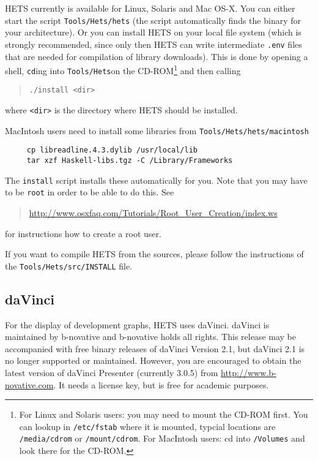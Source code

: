 \documentclass{article}
\newcommand{\normalTEXTSC}[2]{{#1\scriptsize#2}}
\newcommand     {\Hets}{\normalTEXTSC{H}{ETS}\xspace}
\begin{document}
\Hets currently is available for Linux, Solaris and
Mac OS-X. You can either start the script \texttt{Tools/Hets/hets} 
(the script automatically finds the binary for your architecture).
Or you can install \Hets on your local file system (which
is strongly recommended, since only then \Hets can write intermediate
\texttt{.env} files that are needed for compilation of library
downloads). This is done by
opening a shell, \texttt{cd}ing
into \texttt{Tools/Hets}on the CD-ROM\footnote{
For Linux and Solaris users: you may need to mount the CD-ROM first.
You can lookup in \texttt{/etc/fstab}
where it is mounted, typcial locations are \texttt{/media/cdrom}
or \texttt{/mount/cdrom}. 
For MacIntosh
users: cd into \texttt{/Volumes} and look there for the CD-ROM.} and then calling
\begin{quote}
\texttt{./install <dir>}
\end{quote}
where \texttt{<dir>} is the directory where \Hets should be
installed.

MacIntosh users need to install some libraries from 
\texttt{Tools/Hets/hets/macintosh}
\begin{verbatim}
     cp libreadline.4.3.dylib /usr/local/lib
     tar xzf Haskell-libs.tgz -C /Library/Frameworks 
\end{verbatim}
The \texttt{install} script installs these automatically for you.
Note that you may have to be \texttt{root} in order to be able to 
do this. See
\begin{quote}
 \url{http://www.osxfaq.com/Tutorials/Root\_User\_Creation/index.ws}
\end{quote}
for instructions how to create a root user.


If you want to compile \Hets from the sources, please follow the
instructions of the \texttt{Tools/Hets/src/INSTALL} file.

\subsection*{daVinci}
For the display of development graphs, \Hets uses daVinci.
daVinci is maintained by b-novative and b-novative holds all rights.
This release may be accompanied with free binary releases of daVinci
Version 2.1, but daVinci 2.1 is no longer supported or maintained.
However, you are encouraged to obtain the latest version of daVinci
Presenter (currently 3.0.5) from \url{http://www.b-novative.com}.
It needs a license key, but is free for academic purposes.
\end{document}
